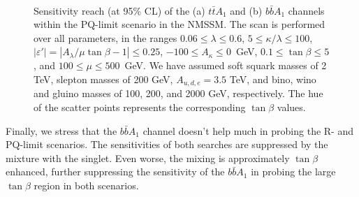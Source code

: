 \documentclass[preprintnumbers,superscriptaddress,nofootinbib,aps,prd,floatfix]{revtex4}
\begin{document}
\begin{enumerate}
\begin{figure}[htbp]
\begin{center}
 \\
\caption{Sensitivity reach (at 95\% CL) of  the (a) $t\bar{t}A_1$ and (b) $b\bar{b} A_1$ channels within the PQ-limit scenario in the NMSSM. 
The scan is performed over all parameters, in the ranges $0.06 \leq \lambda \leq 0.6$, 
$5 \leq \kappa / \lambda \leq 100$, $|\varepsilon'| = \left| A_\lambda/\mu \tan\beta -1\right| \leq 0.25$, 
$-100 \leq A_\kappa \leq 0$~GeV, $0.1 \leq \tan \beta \leq 5$, and $100 \leq \mu \leq 500$~GeV.  
We have assumed soft squark masses of 2 TeV, slepton masses of 200 GeV, $A_{u,d,e} = 3.5$ TeV, and bino, wino and gluino masses of
100, 200, and 2000 GeV, respectively. The hue of the scatter points represents the corresponding $\tan\beta$ values.}
\label{fig:reach_PQ} 
\end{center}
\end{figure}

\end{enumerate}

Finally, we stress that the $b\bar b A_1$ channel doesn't help much in probing the R- and PQ-limit scenarios. The sensitivities of both searches are suppressed by the mixture with the singlet. Even worse, the mixing is approximately $\tan\beta$ enhanced, further suppressing the sensitivity of the $b\bar b A_1$ in probing the large $\tan\beta$ region in both scenarios.
\end{document}
